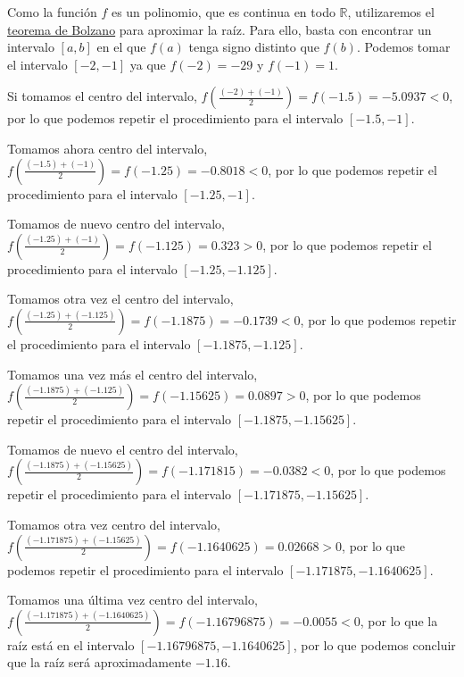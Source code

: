\documentclass[
  spanish,
  a4paper,
]{scrreport}
\theoremstyle{definition}
\theoremstyle{remark}
\begin{document}
\begin{tcolorbox}[enhanced jigsaw, arc=.35mm, bottomrule=.15mm, bottomtitle=1mm, breakable, colback=white, colbacktitle=quarto-callout-tip-color!10!white, colframe=quarto-callout-tip-color-frame, coltitle=black, left=2mm, leftrule=.75mm, opacityback=0, opacitybacktitle=0.6, rightrule=.15mm, title=\textcolor{quarto-callout-tip-color}{\faLightbulb}\hspace{0.5em}{Solución}, titlerule=0mm, toprule=.15mm, toptitle=1mm]

Como la función \(f\) es un polinomio, que es continua en todo
\(\mathbb{R}\), utilizaremos el
\href{https://aprendeconalf.es/analisis-manual/06-limites.html\#thm-bolzano}{teorema
de Bolzano} para aproximar la raíz. Para ello, basta con encontrar un
intervalo \([a,b]\) en el que \(f(a)\) tenga signo distinto que
\(f(b)\). Podemos tomar el intervalo \([-2,-1]\) ya que \(f(-2)=-29\) y
\(f(-1)=1\).

Si tomamos el centro del intervalo,
\(f\left(\frac{(-2)+(-1)}{2}\right)=f(-1.5)= -5.0937<0\), por lo que
podemos repetir el procedimiento para el intervalo \([-1.5,-1]\).

Tomamos ahora centro del intervalo,
\(f\left(\frac{(-1.5)+(-1)}{2}\right)=f(-1.25)= -0.8018<0\), por lo que
podemos repetir el procedimiento para el intervalo \([-1.25,-1]\).

Tomamos de nuevo centro del intervalo,
\(f\left(\frac{(-1.25)+(-1)}{2}\right)=f(-1.125)= 0.323>0\), por lo que
podemos repetir el procedimiento para el intervalo \([-1.25,-1.125]\).

Tomamos otra vez el centro del intervalo,
\(f\left(\frac{(-1.25)+(-1.125)}{2}\right)=f(-1.1875)= -0.1739<0\), por
lo que podemos repetir el procedimiento para el intervalo
\([-1.1875,-1.125]\).

Tomamos una vez más el centro del intervalo,
\(f\left(\frac{(-1.1875)+(-1.125)}{2}\right)=f(-1.15625)= 0.0897>0\),
por lo que podemos repetir el procedimiento para el intervalo
\([-1.1875,-1.15625]\).

Tomamos de nuevo el centro del intervalo,
\(f\left(\frac{(-1.1875)+(-1.15625)}{2}\right)=f(-1.171815)= -0.0382<0\),
por lo que podemos repetir el procedimiento para el intervalo
\([-1.171875,-1.15625]\).

Tomamos otra vez centro del intervalo,
\(f\left(\frac{(-1.171875)+(-1.15625)}{2}\right)=f(-1.1640625)= 0.02668>0\),
por lo que podemos repetir el procedimiento para el intervalo
\([-1.171875,-1.1640625]\).

Tomamos una última vez centro del intervalo,
\(f\left(\frac{(-1.171875)+(-1.1640625)}{2}\right)=f(-1.16796875)= -0.0055<0\),
por lo que la raíz está en el intervalo \([-1.16796875,-1.1640625]\),
por lo que podemos concluir que la raíz será aproximadamente \(-1.16\).

\end{tcolorbox}
\end{document}
